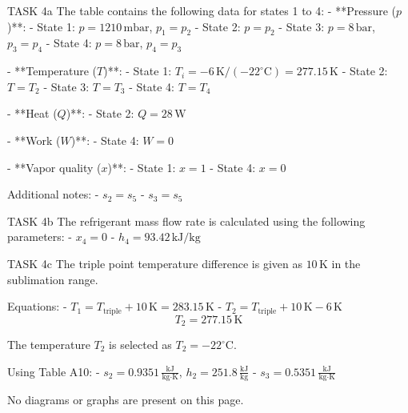 TASK 4a  
The table contains the following data for states 1 to 4:  
- **Pressure (\(p\))**:  
  - State 1: \( p = 1210 \, \text{mbar} \), \( p_1 = p_2 \)  
  - State 2: \( p = p_2 \)  
  - State 3: \( p = 8 \, \text{bar} \), \( p_3 = p_4 \)  
  - State 4: \( p = 8 \, \text{bar} \), \( p_4 = p_3 \)  

- **Temperature (\(T\))**:  
  - State 1: \( T_i = -6 \, \text{K} / (-22^\circ\text{C}) = 277.15 \, \text{K} \)  
  - State 2: \( T = T_2 \)  
  - State 3: \( T = T_3 \)  
  - State 4: \( T = T_4 \)  

- **Heat (\(Q\))**:  
  - State 2: \( Q = 28 \, \text{W} \)  

- **Work (\(W\))**:  
  - State 4: \( W = 0 \)  

- **Vapor quality (\(x\))**:  
  - State 1: \( x = 1 \)  
  - State 4: \( x = 0 \)  

Additional notes:  
- \( s_2 = s_5 \)  
- \( s_3 = s_5 \)  

TASK 4b  
The refrigerant mass flow rate is calculated using the following parameters:  
- \( x_4 = 0 \)  
- \( h_4 = 93.42 \, \text{kJ/kg} \)  

TASK 4c  
The triple point temperature difference is given as \( 10 \, \text{K} \) in the sublimation range.  

Equations:  
- \( T_1 = T_{\text{triple}} + 10 \, \text{K} = 283.15 \, \text{K} \)  
- \( T_2 = T_{\text{triple}} + 10 \, \text{K} - 6 \, \text{K} \)  
  \[
  T_2 = 277.15 \, \text{K}
  \]  

The temperature \( T_2 \) is selected as \( T_2 = -22^\circ\text{C} \).  

Using Table A10:  
- \( s_2 = 0.9351 \, \frac{\text{kJ}}{\text{kg·K}} \), \( h_2 = 251.8 \, \frac{\text{kJ}}{\text{kg}} \)  
- \( s_3 = 0.5351 \, \frac{\text{kJ}}{\text{kg·K}} \)  

No diagrams or graphs are present on this page.